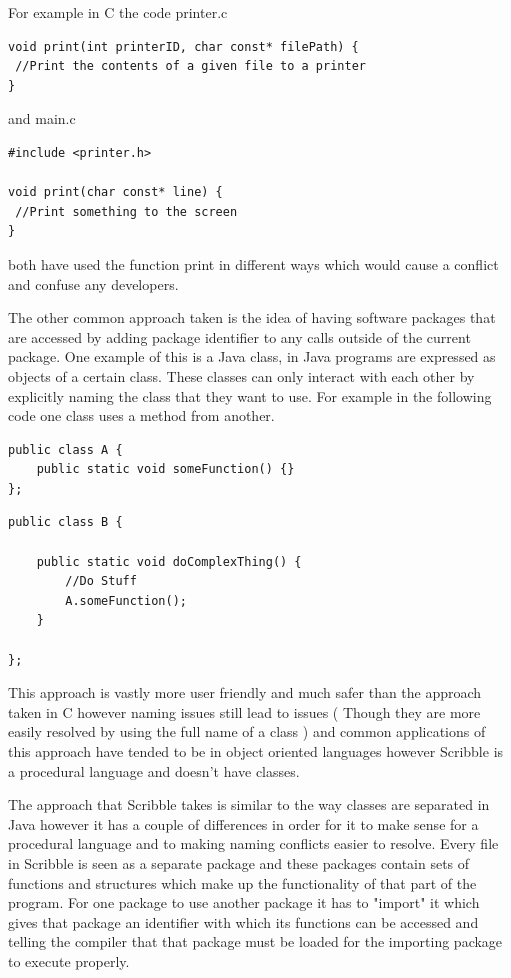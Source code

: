 \documentclass[]{final_report}
\begin{document}
For example in C the code printer.c

\begin{verbatim}
void print(int printerID, char const* filePath) {
 //Print the contents of a given file to a printer
}
\end{verbatim}

and main.c
\begin{verbatim}
#include <printer.h>

void print(char const* line) {
 //Print something to the screen
}
\end{verbatim}

both have used the function print in different ways which would cause a conflict and confuse any developers.

The other common approach taken is the idea of having software packages that are accessed by adding  package identifier to any calls outside of the current package. One example of this is a Java class, in Java programs are expressed as objects of a certain class. These classes can only interact with each other by explicitly naming the class that they want to use. For example in the following code one class uses a method from another.

\begin{verbatim}
public class A {
    public static void someFunction() {}
};
\end{verbatim}

\begin{verbatim}
public class B {

    public static void doComplexThing() {
        //Do Stuff
        A.someFunction();
    }

};
\end{verbatim}

This approach is vastly more user friendly and much safer than the approach taken in C however naming issues still lead to issues ( Though they are more easily resolved by using the full name of a class ) and common applications of this approach have tended to be in object oriented languages however Scribble is a procedural language and doesn't have classes.

The approach that Scribble takes is similar to the way classes are separated in Java however it has a couple of differences in order for it to make sense for a procedural language and to making naming conflicts easier to resolve. Every file in Scribble is seen as a separate package and these packages contain sets of functions and structures which make up the functionality of that part of the program. For one package to use another package it has to "import" it which gives that package an identifier with which its functions can be accessed and telling the compiler that that package must be loaded for the importing package to execute properly.
\end{document}

